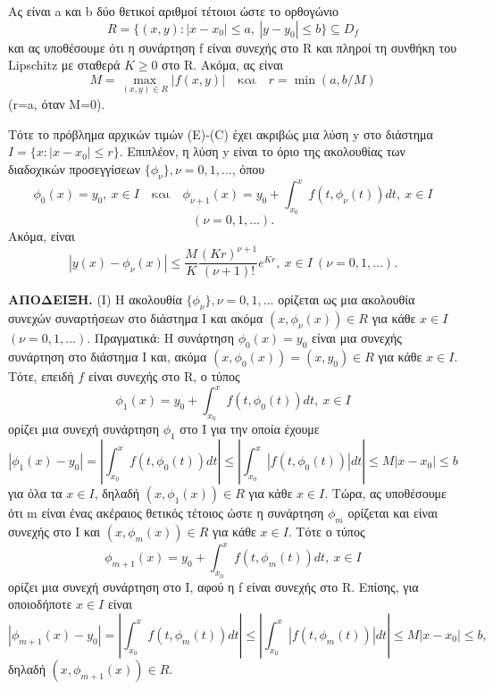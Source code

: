 \documentclass[11pt,a4paper,twoside]{book}
\newcommand{\titlefont}[1]{{\fontfamily{maksf}\selectfont #1}}
\newcounter{thewrhma}[chapter]
\renewcommand{\thethewrhma}{\thechapter.\arabic{thewrhma}}
\newcommand{\thewr}{\refstepcounter{thewrhma}{\bf\titlefont{\textcolor{secondarycolor}{\large Θεώρημα\hspace{2mm}\thethewrhma}}}\hspace{1mm}}{}
\newenvironment{Thewrhma}[1]
{\begin{tcolorbox}[title=\thewr\ \ :\ \  {\textcolor{black}{\bf{\large\titlefont{#1}}}},
breakable,
enhanced standard,
titlerule=-.2pt,
toprule=0pt, 
rightrule=0pt, 
bottomrule=0pt,
colback=white,
left=2mm,
top=1mm,
bottom=0mm,
boxrule=0pt,
colframe=white,
borderline west={1.5mm}{0pt}{secondarycolor},
leftrule=2mm,
sharp corners,
coltitle=secondarycolor]}
{\end{tcolorbox}}
\begin{document}
\begin{Thewrhma}{}
Ας είναι a και b δύο θετικοί αριθμοί τέτοιοι ώστε το ορθογώνιο
\[
R = \{ (x,y) : |x-x_0| \le a, \ |y-y_0| \le b \} \subseteq D_f
\]
και ας υποθέσουμε ότι η συνάρτηση f είναι συνεχής στο R και πληροί τη συνθήκη του Lipschitz με σταθερά $K \ge 0$ στο R. Ακόμα, ας είναι
\[
M = \max_{(x,y) \in R} |f(x,y)| \quad \text{και} \quad r = \min(a,b/M)
\]
(r=a, όταν M=0).
\end{Thewrhma}
Τότε το πρόβλημα αρχικών τιμών (E)-(C) έχει ακριβώς μια λύση y στο διάστημα $I = \{x:|x-x_0| \le r \}$. Επιπλέον, η λύση y είναι το όριο της ακολουθίας των διαδοχικών προσεγγίσεων $\{\phi_\nu\}, \nu=0,1,\dots$, όπου
\[
\phi_0(x) = y_0, \ x \in I \quad \text{και} \quad \phi_{\nu+1}(x) = y_0 + \int_{x_0}^x f(t, \phi_\nu(t))dt, \ x \in I
\]
\[
(\nu=0,1,\dots).
\]
Ακόμα, είναι
\[
|y(x)-\phi_\nu(x)| \le \frac{M}{K} \frac{(Kr)^{\nu+1}}{(\nu+1)!}e^{Kr}, \ x \in I \ (\nu=0,1,\dots).
\]

\textbf{ΑΠΟΔΕΙΞΗ.} (I) Η ακολουθία $\{\phi_\nu\}, \nu=0,1,\dots$ ορίζεται ως μια ακολουθία συνεχών συναρτήσεων στο διάστημα I και ακόμα $(x,\phi_\nu(x)) \in R$ για κάθε $x \in I$ $(\nu=0,1,\dots)$. Πραγματικά: Η συνάρτηση $\phi_0(x)=y_0$ είναι μια συνεχής συνάρτηση στο διάστημα I και, ακόμα $(x, \phi_0(x)) = (x,y_0) \in R$ για κάθε $x \in I$. Τότε, επειδή $f$ είναι συνεχής στο R, ο τύπος
\[
\phi_1(x) = y_0 + \int_{x_0}^x f(t, \phi_0(t))dt, \ x \in I
\]
ορίζει μια συνεχή συνάρτηση $\phi_1$ στο I για την οποία έχουμε
\[
|\phi_1(x)-y_0| = \left|\int_{x_0}^x f(t,\phi_0(t))dt\right| \le \left|\int_{x_0}^x |f(t,\phi_0(t))|dt\right| \le M|x-x_0| \le b
\]
για όλα τα $x \in I$, δηλαδή $(x,\phi_1(x)) \in R$ για κάθε $x \in I$. Τώρα, ας υποθέσουμε ότι m είναι ένας ακέραιος θετικός τέτοιος ώστε η συνάρτηση $\phi_m$ ορίζεται και είναι συνεχής στο I και $(x,\phi_m(x)) \in R$ για κάθε $x \in I$. Τότε ο τύπος
\[
\phi_{m+1}(x) = y_0 + \int_{x_0}^x f(t, \phi_m(t))dt, \ x \in I
\]
ορίζει μια συνεχή συνάρτηση στο I, αφού η f είναι συνεχής στο R. Επίσης, για οποιοδήποτε $x \in I$ είναι
\[
|\phi_{m+1}(x)-y_0| = \left|\int_{x_0}^x f(t,\phi_m(t))dt\right| \le \left|\int_{x_0}^x |f(t,\phi_m(t))|dt\right| \le M|x-x_0| \le b,
\]
δηλαδή $(x, \phi_{m+1}(x)) \in R$.
\end{document}
